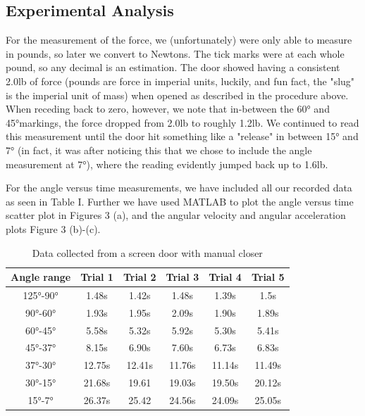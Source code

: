     \subsection{Experimental Analysis}
        For the measurement of the force, we (unfortunately) were only able to measure in pounds, so later we convert to Newtons. The tick marks were at each whole pound, so any decimal is an estimation. The door showed having a consistent 2.0lb of force (pounds are force in imperial units, luckily, and fun fact, the "slug" is the imperial unit of mass) when opened as described in the procedure above. When receding back to zero, however, we note that in-between the 60° and 45°markings, the force dropped from 2.0lb to roughly 1.2lb. We continued to read this measurement until the door hit something like a "release" in between 15° and 7° (in fact, it was after noticing this that we chose to include the angle measurement at 7°), where the reading evidently jumped back up to 1.6lb.\par
        For the angle versus time measurements, we have included all our recorded data as seen in Table I. Further we have used MATLAB to plot the angle versus time scatter plot in Figures 3 (a), and the angular velocity and angular acceleration plots Figure 3 (b)-(c).
        \begin{center}
            \begin{table}
            \begin{tabular}{||c || c c c c c||} 
            \hline
            Angle range & Trial 1 & Trial 2 & Trial 3 & Trial 4 & Trial 5\\ [0.5ex] 
            \hline\hline
             125°-90° & 1.48s &  1.42s & 1.48s & 1.39s & 1.5s \\ 
            \hline
            90°-60° & 1.93s & 1.95s & 2.09s & 1.90s & 1.89s \\
            \hline
            60°-45° & 5.58s & 5.32s & 5.92s & 5.30s & 5.41s \\
            \hline
             45°-37° & 8.15s & 6.90s & 7.60s & 6.73s & 6.83s \\
            \hline
            37°-30° & 12.75s & 12.41s & 11.76s & 11.14s & 11.49s \\ 
            \hline
            30°-15° & 21.68s & 19.61 & 19.03s & 19.50s & 20.12s\\
            \hline
            15°-7° & 26.37s & 25.42 & 24.56s & 24.09s & 25.05s\\ [1ex] 
            \hline
            \end{tabular}
            \caption{Data collected from a screen door with manual closer}
            \label{table:1}
            \end{table}
        \end{center}
